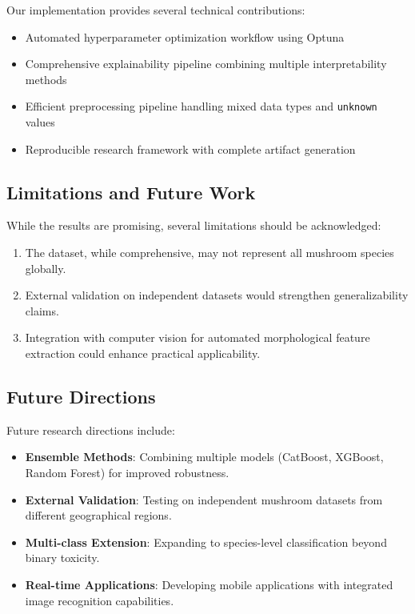 \documentclass[11pt,a4paper]{article}
\begin{document}
Our implementation provides several technical contributions:
\begin{itemize}
    \item Automated hyperparameter optimization workflow using Optuna
    \item Comprehensive explainability pipeline combining multiple interpretability methods
    \item Efficient preprocessing pipeline handling mixed data types and \texttt{unknown} values
    \item Reproducible research framework with complete artifact generation
\end{itemize}

\subsection{Limitations and Future Work}

While the results are promising, several limitations should be acknowledged:

\begin{enumerate}
    \item The dataset, while comprehensive, may not represent all mushroom species globally.
    \item External validation on independent datasets would strengthen generalizability claims.
    \item Integration with computer vision for automated morphological feature extraction could enhance practical applicability.
\end{enumerate}

\subsection{Future Directions}

Future research directions include:
\begin{itemize}
    \item \textbf{Ensemble Methods}: Combining multiple models (CatBoost, XGBoost, Random Forest) for improved robustness.
    \item \textbf{External Validation}: Testing on independent mushroom datasets from different geographical regions.
    \item \textbf{Multi-class Extension}: Expanding to species-level classification beyond binary toxicity.
    \item \textbf{Real-time Applications}: Developing mobile applications with integrated image recognition capabilities.
\end{itemize}
\end{document}
